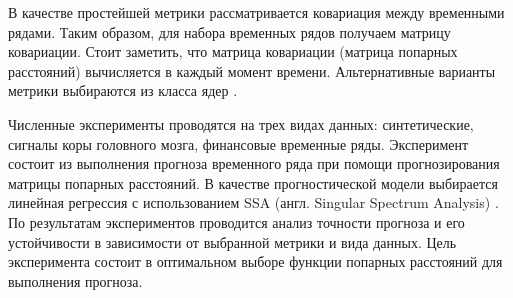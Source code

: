 \documentclass{article}
\begin{document}
В качестве простейшей метрики рассматривается ковариация между временными рядами. \cite{Boyd} Таким образом, для набора временных рядов получаем матрицу ковариации. Стоит заметить, что матрица ковариации (матрица попарных расстояний) вычисляется в каждый момент времени. Альтернативные варианты метрики выбираются из класса ядер \cite{shawe2004kernel}.

Численные эксперименты проводятся на трех видах данных: синтетические, сигналы коры головного мозга, финансовые временные ряды. Эксперимент состоит из выполнения прогноза временного ряда при помощи прогнозирования матрицы попарных расстояний. В качестве прогностической модели выбирается линейная регрессия с использованием SSA (англ. Singular Spectrum Analysis) \cite{vautard1992singular}. По результатам экспериментов проводится анализ точности прогноза и его устойчивости в зависимости от выбранной метрики и вида данных. Цель эксперимента состоит в оптимальном выборе функции попарных расстояний для выполнения прогноза.



\end{document}
